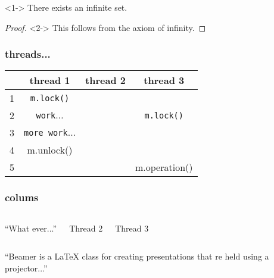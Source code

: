 \documentclass{beamer}
\begin{document}
\begin{frame}
  \begin{theorem}<1->
    There exists an infinite set.
  \end{theorem}

  \begin{proof}<2->
    This follows from the axiom of infinity.
  \end{proof}
\end{frame}

\begin{frame}[fragile]
  \frametitle{threads...}
  \begin{center}
    \begin{tabular}{l|c|c|c}
      &thread 1 & thread 2 & thread 3\\
      \hline
      1&\verb|m.lock()| & &\\
      \hline
      2&\verb|work|$\ldots$& & \verb|m.lock()|\\
      \hline
      3&\verb|more work|$\ldots$&&\\
      \hline
      4&m.unlock() &&\\
      \hline
      5&&&m.operation()
    \end{tabular}
  \end{center}
\end{frame}

\begin{frame}
  \frametitle{colums}
  \begin{columns}[t]
    \begin{block}{}
      ``What ever...''
    \end{block}
    Thread 2

    Thread 3
  \end{columns}
\end{frame}


\begin{frame}
  \begin{block}{}
    ``Beamer is a {\LaTeX} class for creating presentations that re held
    using a projector...''
  \end{block}
\end{frame}
\end{document}
